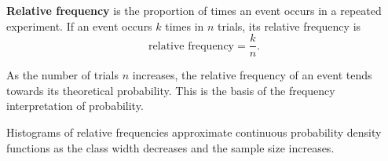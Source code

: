 
\textbf{Relative frequency} is the proportion of times an event occurs in a repeated experiment. If an event occurs $k$ times in $n$ trials, its relative frequency is
\[
\text{relative frequency} = \frac{k}{n}.
\]

As the number of trials $n$ increases, the relative frequency of an event tends towards its theoretical probability. This is the basis of the frequency interpretation of probability.

\begin{remark}
Histograms of relative frequencies approximate continuous probability density functions as the class width decreases and the sample size increases.
\end{remark}


